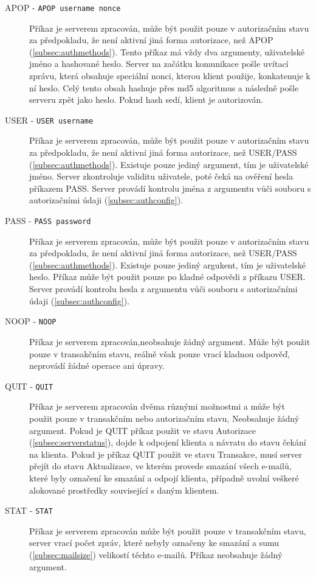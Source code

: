 \documentclass[11pt,a4paper]{report}
\begin{document}
    \begin{description}
        \item[APOP - \texttt{APOP username nonce}] Příkaz je serverem zpracován, může být použit pouze v autorizačním stavu za předpokladu, že není aktivní jiná forma autorizace, než APOP (\ref{subsec:authmethods}). Tento příkaz má vždy dva argumenty, uživatelské jméno a hashované heslo. Server na začátku komunikace pošle uvítací zprávu, která obsahuje speciální nonci, kterou klient použije, konkatenuje k ní heslo. Celý tento obsah hashuje přes md5 algoritmus a následně pošle serveru zpět jako heslo. Pokud hash sedí, klient je autorizován.
        \item[USER - \texttt{USER username}] Příkaz je serverem zpracován, může být použit pouze v autorizačním stavu za předpokladu, že není aktivní jiná forma autorizace, než USER/PASS (\ref{subsec:authmethods}). Existuje pouze jediný argument, tím je uživatelské jméno. Server zkontroluje validitu uživatele, poté čeká na ověření hesla příkazem PASS. Server provádí kontrolu jména z argumentu vůči souboru s autorizačními údaji (\ref{subsec:authconfig}).
        \item[PASS - \texttt{PASS password}] Příkaz je serverem zpracován, může být použit pouze v autorizačním stavu za předpokladu, že není aktivní jiná forma autorizace, než USER/PASS (\ref{subsec:authmethods}). Existuje pouze jediný argukent, tím je uživatelské heslo. Příkaz může být použit pouze po kladné odpovědi z příkazu USER. Server provádí kontrolu hesla z argumentu vůči souboru s autorizačními údaji (\ref{subsec:authconfig}).
        \item[NOOP - \texttt{NOOP}] Příkaz je serverem zpracován,neobsahuje žádný argument. Může být použit pouze v transakčním stavu, reálně však pouze vrací kladnou odpověď, neprovádí žádné operace ani úpravy.
        \item[QUIT - \texttt{QUIT}] Příkaz je serverem zpracován dvěma různými možnostmi a může být použit pouze v transakčním nebo autorizačním stavu, Neobsahuje žádný argument. Pokud je QUIT příkaz použit ve stavu Autorizace (\ref{subsec:serverstatus}), dojde k odpojení klienta a návratu do stavu čekání na klienta. Pokud je příkaz QUIT použit ve stavu Transakce, musí server přejít do stavu Aktualizace, ve kterém provede smazání všech e-mailů, které byly označení ke smazání a odpojí klienta, případně uvolní veškeré alokované prostředky související s daným klientem.
        \item[STAT - \texttt{STAT}] Příkaz je serverem zpracován může být použit pouze v transakčním stavu, server vrací počet zpráv, které nebyly označeny ke smazání a sumu (\ref{subsec:mailsize}) velikostí těchto e-mailů. Příkaz neobsahuje žádný argument.

\end{description}
\end{document}
